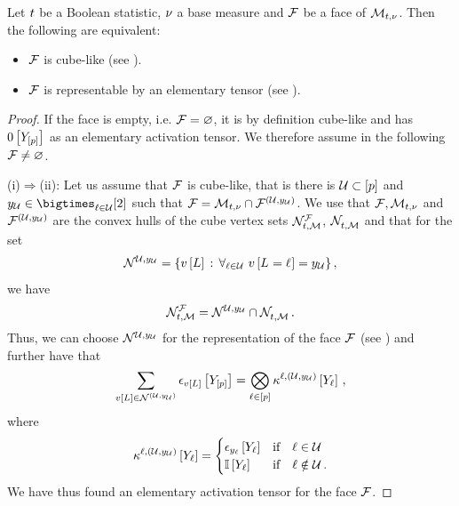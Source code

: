 \begin{theorem}
    \label{the:faceMeasureHardLogicNetworks}
    Let $t$ be a Boolean statistic, $\nu$ a base measure and $\mathcal{F}$ be a face of $\mathcal{M}_{t,\nu}$.
    Then the following are equivalent:
    \begin{itemize}
        \item[(i)] $\mathcal{F}$ is cube-like (see ).
        \item[(ii)] $\mathcal{F}$ is representable by an elementary tensor (see ).
    \end{itemize}
\end{theorem}
\begin{proof}
    If the face is empty, i.e. $\mathcal{F}=\varnothing$, it is by definition cube-like and has $0\left[Y_{[p]}\right]$ as an elementary activation tensor.
    We therefore assume in the following $\mathcal{F}\neq\varnothing$.

    (i)$\Rightarrow$(ii):
    Let us assume that $\mathcal{F}$ is cube-like, that is there is $\mathcal{U}\subset[p]$ and $\headindexof{\arbset}\in\bigtimes_{\selindex\in\arbset}[2]$ such that $\mathcal{F} = \mathcal{M}_{t,\nu} \cap \mathcal{F}^{(\mathcal{U},y_{\mathcal{U}})}$.
    We use that $\mathcal{F},\mathcal{M}_{t,\nu}$ and $\mathcal{F}^{(\mathcal{U},y_{\mathcal{U}})}$ are the convex hulls of the cube vertex sets $\mathcal{N}_{t,\mathcal{M}}^{\mathcal{F}}$, $\mathcal{N}_{t,\mathcal{M}}^{}$ and that for the set
    \begin{align}\label{eq:cubeFaceVertices}
        \mathcal{N}_{}^{\mathcal{U},y_{\mathcal{U}}}
        = \{v\left[L\right] \,:\, \forall_{\ell\in\mathcal{U}} \,\, {v\left[L_{}=\ell_{}\right]=y_{\mathcal{U}}}\} \, ,
    \end{align}
    we have
    \begin{align*}
        \mathcal{N}_{t,\mathcal{M}}^{\mathcal{F}}
        = \mathcal{N}_{}^{\mathcal{U},y_{\mathcal{U}}} \cap \mathcal{N}_{t,\mathcal{M}}^{} \, .
    \end{align*}
    Thus, we can choose $\mathcal{N}_{}^{\mathcal{U},y_{\mathcal{U}}}$ for the representation of the face $\mathcal{F}$ (see ) and further have that
    \begin{align*}
        \sum_{v\left[L\right]\in\mathcal{N}_{}^{(\mathcal{U},y_{\mathcal{U}})}}\epsilon_{v\left[L\right]}\left[Y_{[p]}\right]
        = \bigotimes_{\ell\in[p]} \kappa^{\ell,(\mathcal{U},y_{\mathcal{U}})}\left[Y_{\ell}\right] \, ,
    \end{align*}
    where
    \begin{align*}
        \kappa^{\ell,(\mathcal{U},y_{\mathcal{U}})}\left[Y_{\ell}\right]
        = \begin{cases}
                \epsilon_{y_{\ell}}\left[Y_{\ell}\right] & \text{if}\quad \ell\in\mathcal{U} \\
                \mathbb{I}\left[Y_{\ell}\right] & \text{if}\quad \ell\notin\mathcal{U} \, .
        \end{cases}
    \end{align*}
    We have thus found an elementary activation tensor for the face $\mathcal{F}$.


\end{proof}
